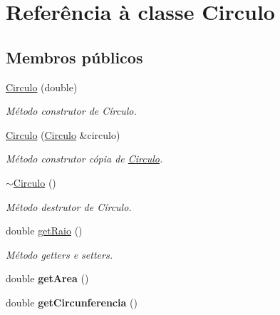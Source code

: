 \hypertarget{classCirculo}{\section{Referência à classe Circulo}
\label{classCirculo}
}
\subsection*{Membros públicos}
\begin{DoxyCompactItemize}
\item 
\hyperlink{classCirculo_a2e4f6526706611ceccd90f4e8bef7795}{Circulo} (double)
\begin{DoxyCompactList}\small\item\em Método construtor de Círculo. \end{DoxyCompactList}\item 
\hyperlink{classCirculo_a01a523953263f160d46835aa7aa97df1}{Circulo} (\hyperlink{classCirculo}{Circulo} \&circulo)
\begin{DoxyCompactList}\small\item\em Método construtor cópia de \hyperlink{classCirculo}{Circulo}. \end{DoxyCompactList}\item 
\hypertarget{classCirculo_a8efe39e0e89487519cd802f0738d3bf4}{\hyperlink{classCirculo_a8efe39e0e89487519cd802f0738d3bf4}{$\sim$\-Circulo} ()}\label{classCirculo_a8efe39e0e89487519cd802f0738d3bf4}

\begin{DoxyCompactList}\small\item\em Método destrutor de Círculo. \end{DoxyCompactList}\item 
\hypertarget{classCirculo_a1c475b6bc5e02d0975f8c79b1654f66d}{double \hyperlink{classCirculo_a1c475b6bc5e02d0975f8c79b1654f66d}{get\-Raio} ()}\label{classCirculo_a1c475b6bc5e02d0975f8c79b1654f66d}

\begin{DoxyCompactList}\small\item\em Método getters e setters. \end{DoxyCompactList}\item 
\hypertarget{classCirculo_a882fbba36f59e329a9f45dfc611e1ed3}{double {\bfseries get\-Area} ()}\label{classCirculo_a882fbba36f59e329a9f45dfc611e1ed3}

\item 
\hypertarget{classCirculo_a606dbae3af0d2894104466b2afeb486e}{double {\bfseries get\-Circunferencia} ()}\label{classCirculo_a606dbae3af0d2894104466b2afeb486e}

\end{DoxyCompactItemize}
